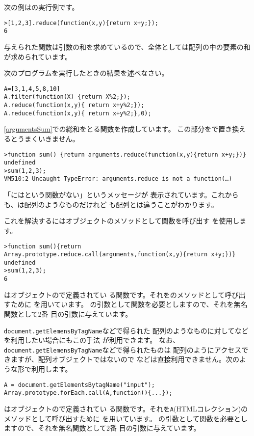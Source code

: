 次の例はの実行例です。
\begin{Verbatim}
>[1,2,3].reduce(function(x,y){return x+y;});
6
\end{Verbatim}
与えられた関数は引数の和を求めているので、全体としては配列の中の要素の和
が求められています。
\begin{Problem}\upshape
 次のプログラムを実行したときの結果を述べなさい。
\begin{Verbatim}
A=[3,1,4,5,8,10]
A.filter(function(X) {return X%2;});
A.reduce(function(x,y){ return x+y%2;});
A.reduce(function(x,y){ return x+y%2;},0);
\end{Verbatim}
\end{Problem}
\iffalse
\ref{argumentsSum}での総和をとる関数を作成しています。
この部分をで置き換えるとうまくいきません。
\begin{Verbatim}
>function sum() {return arguments.reduce(function(x,y){return x+y;})}
undefined
>sum(1,2,3);
VM510:2 Uncaught TypeError: arguments.reduce is not a function(…)
\end{Verbatim}
「にはという関数がない」というメッセージが
表示されています。これからも、は配列のようなものだけれど
も配列とは違うことがわかります。

これを解決するにはオブジェクトのメソッドとして関数を呼び出す
を使用します。
\begin{Verbatim}
>function sum(){return Array.prototype.reduce.call(arguments,function(x,y){return x+y;})}
undefined
>sum(1,2,3);
6
\end{Verbatim}
はオブジェクトので定義されてい
る関数です。それをのメソッドとして呼び出すために
を用いています。
の引数として関数を必要としますので、それを無名関数として2番
目の引数に与えています。

\verb+document.getElemensByTagName+などで得られた
配列のようなものに対してなどを利用したい場合にもこの手法
が利用できます。
\else
なお、\verb+document.getElemensByTagName+などで得られたものは
配列のようにアクセスできますが、配列オブジェクトではないので
などは直接利用できません。次のような形で利用します。

\begin{Verbatim}
A = document.getElementsBytagName("input");
Array.prototype.forEach.call(A,function(){...});
\end{Verbatim}
はオブジェクトので定義されてい
る関数です。それを\texttt{A}(HTMLコレクション)のメソッドとして呼び出すために
を用いています。
の引数として関数を必要としますので、それを無名関数として2番
目の引数に与えています。